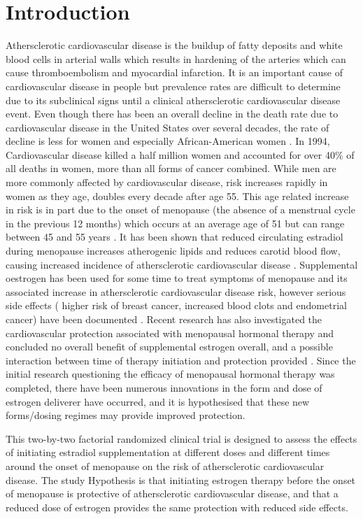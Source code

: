 \documentclass[11pt]{article}
\begin{document}
	\section{Introduction} 
		Athersclerotic cardiovascular disease is the buildup of fatty deposits and white blood cells in arterial walls which results in hardening of the arteries which can cause thromboembolism and myocardial infarction.
		It is an important cause of cardiovascular disease in people but prevalence rates are difficult to determine due to its subclinical signs until a clinical athersclerotic cardiovascular disease event.
		Even though there has been an overall decline in the death rate due to cardiovascular disease in the United States over several decades, the rate of decline is less for women and especially African-American women \cite{Mosca1997}.
		In 1994, Cardiovascular disease killed a half million women and accounted for over 40\% of all deaths in women, more than all forms of cancer combined\cite{AHA1997}.
		While men are more commonly affected by cardiovascular disease, risk increases rapidly in women as they age, doubles every decade after age 55\cite{Gordon1978}. 
		This age related increase in risk is in part due to the onset of menopause (the absence of a menstrual cycle in the previous 12 months) which occurs at an average age of 51 but can range between 45 and 55 years \cite{Gold2012}. 
		It has been shown that reduced circulating estradiol during menopause increases atherogenic lipids and reduces carotid blood flow, causing increased incidence of athersclerotic cardiovascular disease \cite{Hodis}.
		Supplemental oestrogen has been used for some time to treat symptoms of menopause and its associated increase in athersclerotic cardiovascular disease risk, however serious side effects ( higher risk of breast cancer, increased blood clots and endometrial cancer) have been documented \cite{Gold2012}.
		Recent research has also investigated the cardiovascular protection associated with menopausal hormonal therapy and concluded no overall benefit of supplemental estrogen overall, and a possible interaction between time of therapy initiation and protection provided \cite{Anderson2004,Prentice2009}.
		Since the initial research questioning the efficacy of menopausal hormonal therapy was completed, there have been numerous innovations in the form and dose of estrogen deliverer have occurred, and it is hypothesised that these new forms/dosing regimes may provide improved protection.



		This two-by-two factorial randomized clinical trial is designed to assess the effects of initiating estradiol supplementation at different doses and different times around the onset of menopause on the risk of athersclerotic cardiovascular disease.
		The study Hypothesis is that initiating estrogen therapy before the onset of menopause is protective of athersclerotic cardiovascular disease, and that a reduced dose of estrogen provides the same protection with reduced side effects.
\end{document}
